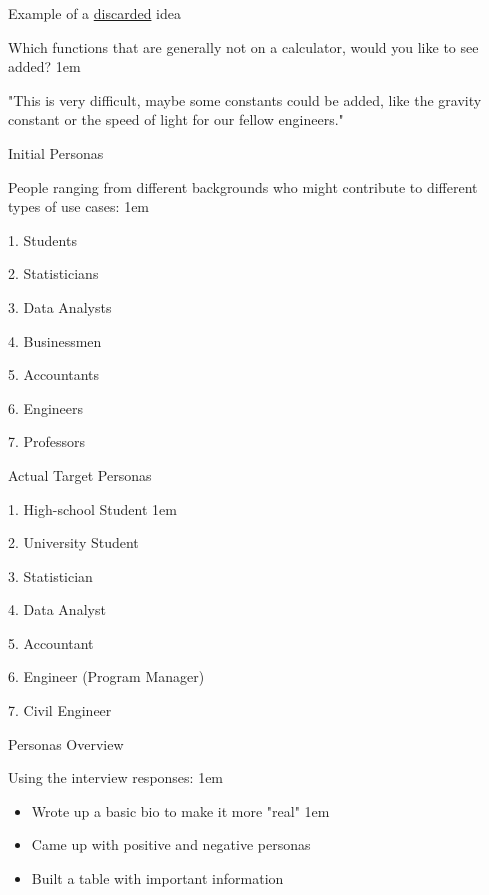 \documentclass[12pt]{beamer}
\begin{document}
\begin{frame}{Example of a \underline{discarded} idea }
    \item \textcolor{colorgreen}{Which functions that are generally not on a calculator, would you like to see added?} \pause
    \itemsep1em
    \item "This is very difficult, maybe some constants could be added, like the gravity constant or the speed of light for our fellow engineers."
\end{frame}

\begin{frame}{Initial Personas}
    \item People ranging from different backgrounds who might 
    contribute to different types of use cases: 
    \itemsep1em
    \item \textcolor{colorgreen}{1.} Students
    \item \textcolor{colorgreen}{2.} Statisticians
    \item \textcolor{colorgreen}{3.} Data Analysts
    \item \textcolor{colorgreen}{4.} Businessmen
    \item \textcolor{colorgreen}{5.} Accountants
    \item \textcolor{colorgreen}{6.} Engineers
    \item \textcolor{colorgreen}{7.} Professors
\end{frame}

\begin{frame}{Actual Target Personas}
    \item \textcolor{colorgreen}{1.} High-school Student
    \itemsep1em
    \item \textcolor{colorgreen}{2.} University Student
    \item \textcolor{colorgreen}{3.} Statistician
    \item \textcolor{colorgreen}{4.} Data Analyst
    \item \textcolor{colorgreen}{5.} Accountant
    \item \textcolor{colorgreen}{6.} Engineer (Program Manager)
    \item \textcolor{colorgreen}{7.} Civil Engineer
\end{frame}

\begin{frame}{Personas Overview}
    \item Using the interview responses: \pause
    \itemsep1em
    \item
    \begin{itemize}
        \item Wrote up a basic bio to make it more "real" \pause
        \itemsep1em
        \item Came up with positive and negative personas \pause
        \item Built a table with important information
    \end{itemize}
\end{frame}
\end{document}
